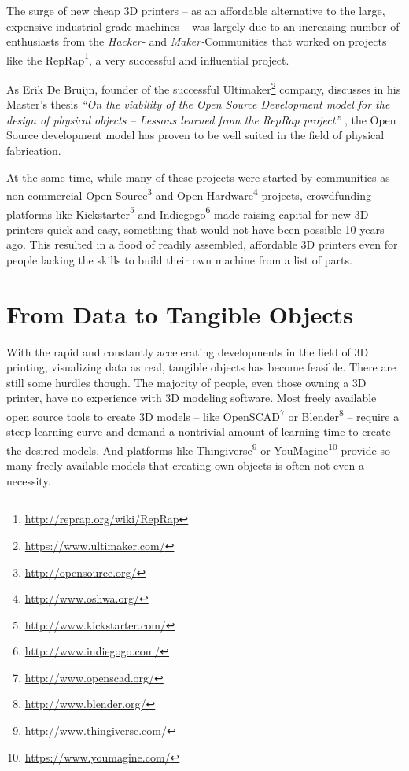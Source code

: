 
The surge of new cheap 3D printers -- as an affordable alternative to the large,
expensive industrial-grade machines -- was largely due to an increasing number
of enthusiasts from the \emph{Hacker-} and \emph{Maker-}Communities that worked
on projects like the RepRap\footnote{\url{http://reprap.org/wiki/RepRap}}, a
very successful and influential project.

As Erik De Bruijn, founder of the successful
Ultimaker\footnote{\url{https://www.ultimaker.com/}} company, discusses in his
Master's thesis \textit{``On the viability of the Open Source Development model
for the design of physical objects -- Lessons learned from the RepRap project''}
\cite{bruijn:2010}, the Open Source development model has proven to be well
suited in the field of physical fabrication.

At the same time, while many of these projects were started by communities as
non commercial Open Source\footnote{\url{http://opensource.org/}} and Open
Hardware\footnote{\url{http://www.oshwa.org/}} projects, crowdfunding platforms
like Kickstarter\footnote{\url{http://www.kickstarter.com/}} and
Indiegogo\footnote{\url{http://www.indiegogo.com/}} made raising capital for new
3D printers quick and easy, something that would not have been possible 10 years
ago. This resulted in a flood of readily assembled, affordable 3D printers even
for people lacking the skills to build their own machine from a list of parts.


\section{From Data to Tangible Objects}

With the rapid and constantly accelerating developments in the field of 3D
printing, visualizing data as real, tangible objects has become feasible. There
are still some hurdles though.  The majority of people, even those owning a 3D
printer, have no experience with 3D modeling software. Most freely available
open source tools to create 3D models -- like
OpenSCAD\footnote{\url{http://www.openscad.org/}} or
Blender\footnote{\url{http://www.blender.org/}} -- require a steep learning
curve and demand a nontrivial amount of learning time to create the desired
models. And platforms like
Thingiverse\footnote{\url{http://www.thingiverse.com/}} or
YouMagine\footnote{\url{https://www.youmagine.com/}} provide so many freely
available models that creating own objects is often not even a necessity.

